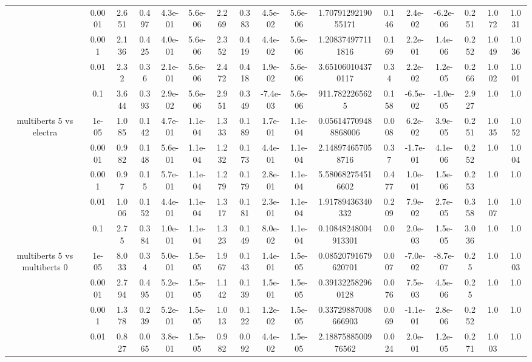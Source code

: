 \begin{tabular}{|c|c|c|c|c|c|c|c|c|c|c|c|c|c|c|c|c|}
 & 0.0001 & 2.651 & 0.497 & 4.3e-01 & 5.6e-06 & 2.269 & 0.383 & 4.5e-02 & 5.6e-06 & 1.7079129219055171 & 0.146 & 2.4e-02 & -6.2e-06 & 0.251 & 1.072 & 1.031 \\
 & 0.001 & 2.136 & 0.425 & 4.0e-01 & 5.6e-06 & 2.352 & 0.419 & 4.4e-02 & 5.6e-06 & 1.208374977111816 & 0.169 & 2.2e-01 & 1.4e-06 & 0.252 & 1.049 & 1.036 \\
 & 0.01 & 2.32 & 0.36 & 2.1e-01 & 5.6e-06 & 2.472 & 0.418 & 1.9e-02 & 5.6e-06 & 3.651060104370117 & 0.34 & 2.2e-02 & 1.2e-05 & 0.266 & 1.002 & 1.001 \\
 & 0.1 & 3.644 & 0.393 & 2.9e-02 & 5.6e-06 & 2.951 & 0.349 & -7.4e-03 & 5.6e-06 & 911.7822265625 & 0.158 & -6.5e-02 & -1.0e-05 & 2.927 & 1.0 & 1.0 \\
\hline
\multirow{5}{*}{multiberts 5 vs electra } & 1e-05 & 1.085 & 0.142 & 4.7e-01 & 1.1e-04 & 1.333 & 0.189 & 1.7e-01 & 1.1e-04 & 0.056147709488868006 & 0.008 & 6.2e-02 & 3.9e-05 & 0.251 & 1.035 & 1.052 \\
 & 0.0001 & 0.982 & 0.148 & 5.6e-01 & 1.1e-04 & 1.232 & 0.173 & 4.4e-01 & 1.1e-04 & 2.148974657058716 & 0.37 & -1.7e-01 & 4.1e-06 & 0.252 & 1.0 & 1.004 \\
 & 0.001 & 0.97 & 0.15 & 5.7e-01 & 1.1e-04 & 1.279 & 0.179 & 2.8e-01 & 1.1e-04 & 5.580682754516602 & 0.477 & 1.0e-01 & 1.5e-06 & 0.253 & 1.0 & 1.0 \\
 & 0.01 & 1.006 & 0.152 & 4.4e-01 & 1.1e-04 & 1.317 & 0.181 & 2.3e-01 & 1.1e-04 & 1.91789436340332 & 0.209 & 7.9e-02 & 2.7e-05 & 0.358 & 1.007 & 1.0 \\
 & 0.1 & 2.75 & 0.384 & 1.0e-01 & 1.1e-04 & 1.323 & 0.149 & 8.0e-02 & 1.1e-04 & 0.10848248004913301 & 0.0 & 2.0e-03 & 1.5e-05 & 3.036 & 1.0 & 1.0 \\
\hline
\multirow{5}{*}{multiberts 5 vs multiberts 0} & 1e-05 & 8.033 & 0.34 & 5.0e-01 & 1.5e-05 & 1.967 & 0.143 & 1.4e-01 & 1.5e-05 & 0.08520791679620701 & 0.007 & -7.0e-02 & -8.7e-07 & 0.25 & 1.0 & 1.003 \\
 & 0.0001 & 2.794 & 0.495 & 5.2e-01 & 1.5e-05 & 1.142 & 0.139 & 1.5e-01 & 1.5e-05 & 0.391322582960128 & 0.076 & 7.5e-03 & 4.5e-06 & 0.25 & 1.0 & 1.0 \\
 & 0.001 & 1.378 & 0.239 & 5.2e-01 & 1.5e-05 & 1.013 & 0.122 & 1.2e-02 & 1.5e-05 & 0.33729887008666903 & 0.069 & -1.1e-01 & 2.8e-06 & 0.252 & 1.0 & 1.0 \\
 & 0.01 & 0.827 & 0.065 & 3.8e-01 & 1.5e-05 & 0.982 & 0.092 & 4.4e-02 & 1.5e-05 & 2.1887588500976562 & 0.024 & 2.0e-01 & 1.2e-05 & 0.271 & 1.003 & 1.0 \\

\end{tabular}
